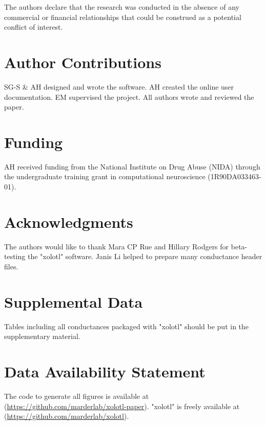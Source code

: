 \documentclass{frontiersSCNS} %
\begin{document}
The authors declare that the research was conducted in the absence of any commercial or financial relationships that could be construed as a potential conflict of interest.

\section*{Author Contributions}

SG-S \& AH designed and wrote the software. AH created the online user documentation. EM supervised the project. All authors wrote and reviewed the paper.

\section*{Funding}

AH received funding from the National Institute on Drug Abuse (NIDA) through the undergraduate training grant in computational neuroscience (1R90DA033463-01).

\section*{Acknowledgments}
The authors would like to thank Mara CP Rue and Hillary Rodgers for beta-testing the "xolotl" software. Janis Li helped to prepare many conductance header files.

\section*{Supplemental Data}
Tables including all conductances packaged with "xolotl" should be put in the supplementary material.

\section*{Data Availability Statement}

The code to generate all figures is available at (\url{https://github.com/marderlab/xolotl-paper}). "xolotl" is freely available at (\url{https://github.com/marderlab/xolotl}).

%
%
%
%
%
%

\printbibliography
\end{document}
